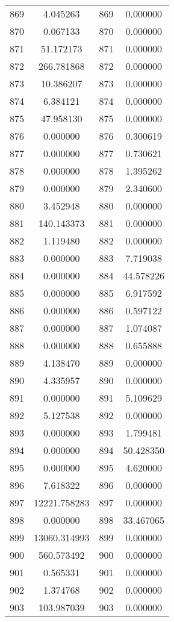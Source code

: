 \documentclass[12pt]{article}
\begin{document}
\begin{longtable}{@{}cccc@{}}
869 & 4.045263 & 869 & 0.000000 \\
870 & 0.067133 & 870 & 0.000000 \\
871 & 51.172173 & 871 & 0.000000 \\
872 & 266.781868 & 872 & 0.000000 \\
873 & 10.386207 & 873 & 0.000000 \\
874 & 6.384121 & 874 & 0.000000 \\
875 & 47.958130 & 875 & 0.000000 \\
876 & 0.000000 & 876 & 0.300619 \\
877 & 0.000000 & 877 & 0.730621 \\
878 & 0.000000 & 878 & 1.395262 \\
879 & 0.000000 & 879 & 2.340600 \\
880 & 3.452948 & 880 & 0.000000 \\
881 & 140.143373 & 881 & 0.000000 \\
882 & 1.119480 & 882 & 0.000000 \\
883 & 0.000000 & 883 & 7.719038 \\
884 & 0.000000 & 884 & 44.578226 \\
885 & 0.000000 & 885 & 6.917592 \\
886 & 0.000000 & 886 & 0.597122 \\
887 & 0.000000 & 887 & 1.074087 \\
888 & 0.000000 & 888 & 0.655888 \\
889 & 4.138470 & 889 & 0.000000 \\
890 & 4.335957 & 890 & 0.000000 \\
891 & 0.000000 & 891 & 5.109629 \\
892 & 5.127538 & 892 & 0.000000 \\
893 & 0.000000 & 893 & 1.799481 \\
894 & 0.000000 & 894 & 50.428350 \\
895 & 0.000000 & 895 & 4.620000 \\
896 & 7.618322 & 896 & 0.000000 \\
897 & 12221.758283 & 897 & 0.000000 \\
898 & 0.000000 & 898 & 33.467065 \\
899 & 13060.314993 & 899 & 0.000000 \\
900 & 560.573492 & 900 & 0.000000 \\
901 & 0.565331 & 901 & 0.000000 \\
902 & 1.374768 & 902 & 0.000000 \\
903 & 103.987039 & 903 & 0.000000 \\

\end{longtable}
\end{document}
